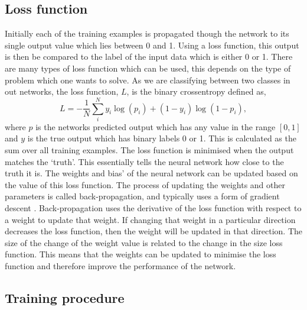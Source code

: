 \subsection{Loss function}

%
Initially each of the training examples is propagated though the network to its single output value which lies between 0 and 1. Using a loss function, this output is then be compared to
the label of the input data which is either 0 or 1. There are many types of loss function which can be used, this depends on the type of problem which one wants to solve. As we are classifying
between two classes in out networks, the loss function, $L$, is the binary
crossentropy defined as,
%
\begin{equation}\label{cnn:loss} 
L = -\frac{1}{N} \sum_{i}^{N} y_i\log{(p_i)} + (1-y_i)\log{(1-p_i)},
\end{equation}
%
where $p$ is the networks predicted output which has any value in the range $[0,1]$ and $y$ is the true output which has binary labels 0 or 1. This is calculated as the sum over all training examples. 
The loss function is minimised when the output matches the `truth'. This essentially
tells the neural network how close to the truth it is. The weights and bias' of
the neural network can be updated based on the value of this loss function. The
process of updating the weights and other parameters is called back-propagation,
and typically uses a form of gradient descent
\cite{kingma2015AdamMethod}.
Back-propagation uses the derivative of the loss function with respect to a weight to update that weight.
If changing that weight in a particular direction decreases the loss function, then the weight will be updated in that direction.
The size of the change of the weight value is related to the change in the size loss function.
This means that the weights can be updated to minimise the loss function and therefore improve the performance of the network.

\subsection{Training procedure}

